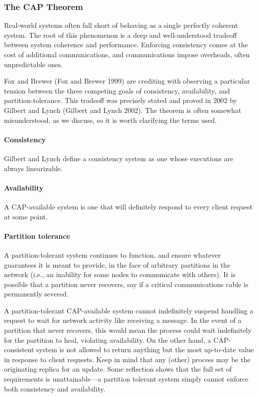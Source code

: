 \documentclass[]             %
{NASA}                       %
\theoremstyle{definition}
\begin{document}
\hypertarget{the-cap-theorem}{%
\subsubsection{The CAP Theorem}\label{the-cap-theorem}}

Real-world systems often fall short of behaving as a single perfectly
coherent system. The root of this phenomenon is a deep and
well-understood tradeoff between system coherence and performance.
Enforcing consistency comes at the cost of additional communications,
and communications impose overheads, often unpredictable ones.

Fox and Brewer (Fox and Brewer 1999) are crediting with observing a
particular tension between the three competing goals of consistency,
availability, and partition-tolerance. This tradeoff was precisely
stated and proved in 2002 by Gilbert and Lynch (Gilbert and Lynch 2002).
The theorem is often somewhat misunderstood, as we discuss, so it is
worth clarifying the terms used.

\hypertarget{consistency}{%
\paragraph{Consistency}\label{consistency}}

Gilbert and Lynch define a consistency system as one whose executions
are always linearizable.

\hypertarget{availability}{%
\paragraph{Availability}\label{availability}}

A CAP-available system is one that will definitely respond to every
client request at some point.

\hypertarget{partition-tolerance}{%
\paragraph{Partition tolerance}\label{partition-tolerance}}

A partition-tolerant system continues to function, and ensure whatever
guarantees it is meant to provide, in the face of arbitrary partitions
in the network (i.e., an inability for some nodes to communicate with
others). It is possible that a partition never recovers, say if a
critical communications cable is permanently severed.

A partition-tolerant CAP-available system cannot indefinitely suspend
handling a request to wait for network activity like receiving a
message. In the event of a partition that never recovers, this would
mean the process could wait indefinitely for the partition to heal,
violating availability. On the other hand, a CAP-consistent system is
not allowed to return anything but the most up-to-date value in response
to client requests. Keep in mind that any (other) process may be the
originating replica for an update. Some reflection shows that the full
set of requirements is unattainable---a partition tolerant system simply
cannot enforce both consistency and availability.
\end{document}
